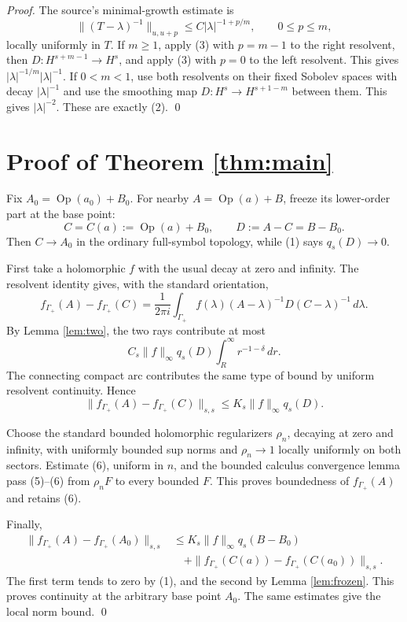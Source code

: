 \documentclass[11pt]{article}
\newcommand{\Op}{\operatorname{Op}}
\begin{document}
\emph{Proof.}
The source's minimal-growth estimate is
\[
 \|(T-\lambda)^{-1}\|_{u,u+p}
 \le C|\lambda|^{-1+p/m},\qquad 0\le p\le m,              \tag{3}
\]
locally uniformly in $T$.  If $m\ge1$, apply (3) with $p=m-1$ to
the right resolvent, then $D:H^{s+m-1}\to H^s$, and apply (3) with
$p=0$ to the left resolvent.  This gives
$|\lambda|^{-1/m}|\lambda|^{-1}$.  If $0<m<1$, use both resolvents
on their fixed Sobolev spaces with decay $|\lambda|^{-1}$ and use the
smoothing map $D:H^s\to H^{s+1-m}$ between them.  This gives
$|\lambda|^{-2}$.  These are exactly (2). \qed

\section*{Proof of Theorem \ref{thm:main}}
Fix $A_0=\Op(a_0)+B_0$.  For nearby $A=\Op(a)+B$, freeze its lower-order
part at the base point:
\[
 C=C(a):=\Op(a)+B_0,\qquad D:=A-C=B-B_0.                  \tag{4}
\]
Then $C\to A_0$ in the ordinary full-symbol topology, while (1) says
$q_s(D)\to0$.

First take a holomorphic $f$ with the usual decay at zero and infinity.
The resolvent identity gives, with the standard orientation,
\[
 f_{\Gamma_+}(A)-f_{\Gamma_+}(C)
 =\frac1{2\pi i}\int_{\Gamma_+}
 f(\lambda)(A-\lambda)^{-1}D(C-\lambda)^{-1}\,d\lambda.  \tag{5}
\]
By Lemma \ref{lem:two}, the two rays contribute at most
\[
 C_s\|f\|_\infty q_s(D)
 \int_R^\infty r^{-1-\delta}\,dr.
\]
The connecting compact arc contributes the same type of bound by uniform
resolvent continuity.  Hence
\[
 \|f_{\Gamma_+}(A)-f_{\Gamma_+}(C)\|_{s,s}
 \le K_s\|f\|_\infty q_s(D).                              \tag{6}
\]

Choose the standard bounded holomorphic regularizers $\rho_n$, decaying at
zero and infinity, with uniformly bounded sup norms and $\rho_n\to1$ locally
uniformly on both sectors.  Estimate (6), uniform in $n$, and the bounded
calculus convergence lemma pass (5)--(6) from $\rho_nF$ to every bounded
$F$.  This proves boundedness of $f_{\Gamma_+}(A)$ and retains (6).

Finally,
\begin{align*}
 \|f_{\Gamma_+}(A)-f_{\Gamma_+}(A_0)\|_{s,s}
 &\le K_s\|f\|_\infty q_s(B-B_0)\\
 &\quad+\|f_{\Gamma_+}(C(a))-f_{\Gamma_+}(C(a_0))\|_{s,s}.
\end{align*}
The first term tends to zero by (1), and the second by Lemma
\ref{lem:frozen}.  This proves continuity at the arbitrary base point $A_0$.
The same estimates give the local norm bound. \qed
\end{document}
